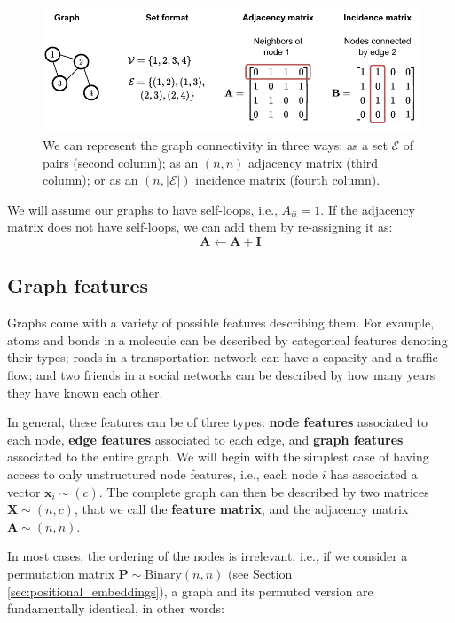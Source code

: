 \begin{figure}[t]
    \centering
    \includegraphics[width=1.0\textwidth]{images/graphs-2}
    \caption{We can represent the graph connectivity in three ways: as a set $\mathcal{E}$ of pairs (second column); as an $(n, n)$ adjacency matrix (third column); or as an $(n, \lvert \mathcal{E} \rvert)$ incidence matrix (fourth column).}
    \label{fig:adjacency_matrix}
\end{figure}

We will assume our graphs to have self-loops, i.e., $A_{ii} = 1$. If the adjacency matrix does not have self-loops, we can add them by re-assigning it as:
%
$$
\mathbf{A} \gets\mathbf{A} + \mathbf{I}
$$

\subsection{Graph features}

Graphs come with a variety of possible features describing them. For example, atoms and bonds in a molecule can be described by categorical features denoting their types; roads in a transportation network can have a capacity and a traffic flow; and two friends in a social networks can be described by how many years they have known each other.

In general, these features can be of three types: \textbf{node features} associated to each node, \textbf{edge features} associated to each edge, and \textbf{graph features} associated to the entire graph. We will begin with the simplest case of having access to only unstructured node features, i.e., each node $i$ has associated a vector $\mathbf{x}_i \sim (c)$. The complete graph can then be described by two matrices $\mathbf{X} \sim (n,c)$, that we call the \textbf{feature matrix}, and the adjacency matrix $\mathbf{A} \sim (n,n)$.

In most cases, the ordering of the nodes is irrelevant, i.e., if we consider a permutation matrix $\mathbf{P} \sim \text{Binary}(n,n)$ (see Section \ref{sec:positional_embeddings}), a graph and its permuted version are fundamentally identical, in other words:

